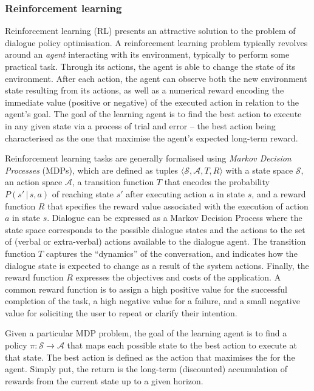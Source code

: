 \subsubsection*{Reinforcement learning}

Reinforcement learning (RL) presents an attractive solution to the problem of dialogue policy optimisation.  A reinforcement learning problem typically revolves around an \textit{agent} interacting with its environment, typically to perform some practical task.  Through its actions, the agent is able to change the state of its environment.  After each action, the agent can observe both the new environment state resulting from its actions, as well as a numerical reward encoding the immediate value (positive or negative) of the executed action in relation to the agent's goal. The goal of the learning agent is to find the best action to execute in any given state via a process of trial and error  -- the best action being characterised as the one that maximise the agent's expected long-term reward.  

Reinforcement learning tasks are generally formalised using \textit{Markov Decision Processes} (MDPs), which are defined as tuples $\langle \mathcal{S}, \mathcal{A}, T, R \rangle$ with a state space $\mathcal{S}$, an action space $\mathcal{A}$, a transition function $T$ that encodes  the probability $P(s'\, | \, s,a)$ of reaching state $s'$ after executing action $a$ in state $s$, and a reward function $R$ that specifies the reward value associated with the execution of action $a$ in state $s$. Dialogue can be expressed as a Markov Decision Process where the state space corresponds to the possible dialogue states and the actions to the set of (verbal or extra-verbal) actions available to the dialogue agent.  The transition function $T$ captures the ``dynamics'' of the conversation, and indicates how the dialogue state is expected to change as a result of the system actions. Finally, the reward function $R$ expresses the objectives and costs of the application. A common reward function is to assign a high positive value for the successful completion of the task, a high negative value for a failure, and a small negative value for soliciting the user to repeat or clarify their intention.  

Given a particular MDP problem, the goal of the learning agent is to find a policy $\pi: \mathcal{S} \rightarrow \mathcal{A}$ that maps each possible state to the best action to execute at that state.  The best action is defined as the action that maximises the  for the agent.  Simply put, the return is the long-term (discounted) accumulation of rewards from the current state up to a given horizon. 

